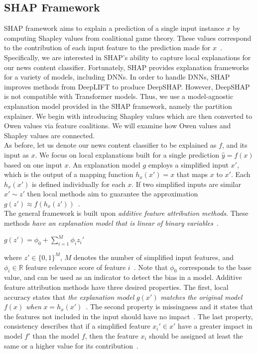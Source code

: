 \subsection{SHAP Framework}
\label{subsec:ExplainingNewsContentModels_SHAPFramework}
SHAP framework aims to explain a prediction of a single input instance $x$ by computing Shapley values from coalitional game
theory. These values correspond to the contribution of each input feature to the prediction made for $x$~\parencite{InterpretableMachineLearning_Molnar}. Specifically, we are interested in SHAP's ability to capture local explanations
for our news content classifier. Fortunately, SHAP provides explanation frameworks for a variety of models, including DNNs. In order to handle DNNs, SHAP improves methods from DeepLIFT to produce DeepSHAP. However, DeepSHAP is not compatible with Transformer models. Thus, we use a model-agnostic explanation model provided in the SHAP framework, namely the partition explainer. We begin with introducing Shapley values which are then converted to Owen values via feature coalitions. We will examine how Owen values and Shapley values are connected.\\
As before, let us denote our news content classifier to be explained as $f$, and its input as $x$. We focus on local explanations built for a single prediction $\hat{y} = f(x)$ based on one input $x$. An explanation model $g$ employs a simplified input $x'$, which is the output of a mapping function $h_x(x') = x$ that maps $x$ to $x'$. Each $h_x(x')$ is defined individually for each $x$. If two simplified inputs are similar $x' \sim z'$ then local methods aim to guarantee the approximation $g(z') \approx f(h_x(z'))$~\parencite{AUnifiedApproach_Lundberg}.\\
The general framework is built upon \emph{additive feature attribution methods}. These methods \emph{have an explanation model that is linear of binary variables}~\parencite{AUnifiedApproach_Lundberg}.\\
\begin{center}
    $g(z') = \phi_0 + \sum\limits_{i=1}^M \phi_i z_i'$
\end{center}
where $z' \in \{0, 1\}^M$, $M$ denotes the number of simplified input features, and $\phi_i \in \mathbb{R}$ feature relevance score of feature $i$~\parencite{AUnifiedApproach_Lundberg}. Note that $\phi_0$ corresponds to the base value, and can be used as an indicator to detect the bias in a model. Additive feature attribution methods have three desired properties. The first, local accuracy states that \emph{the explanation model} $g(x')$ \emph{matches the original model} $f(x)$ \emph{when} $x = h_x(x')$~\parencite{AUnifiedApproach_Lundberg}. The second property is missingness and it states that the features not included in the input should have no impact~\parencite{AUnifiedApproach_Lundberg}. The last property, consistency describes that if a simplified feature $x_i' \in x'$ have a greater impact in model $f'$ than the model $f$, then the feature $x_i$ should be assigned at least the same or a higher value for its contribution~\parencite{AUnifiedApproach_Lundberg}. \\
